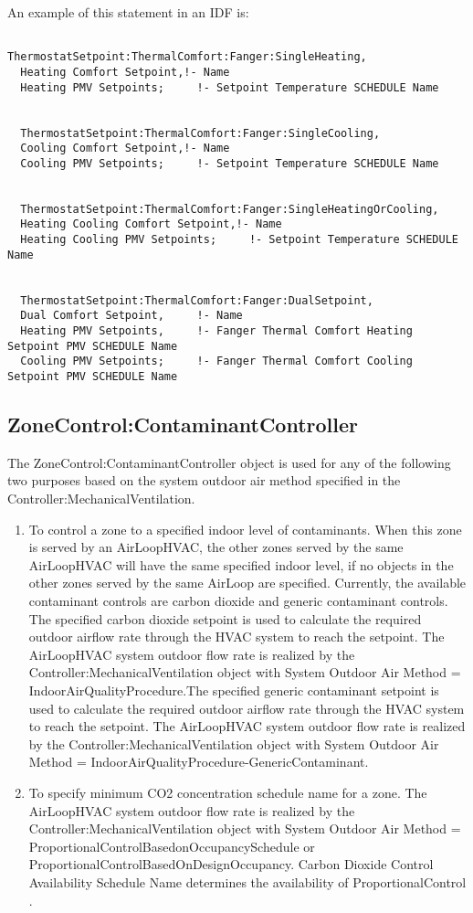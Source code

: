 An example of this statement in an IDF is:

\begin{lstlisting}

ThermostatSetpoint:ThermalComfort:Fanger:SingleHeating,
  Heating Comfort Setpoint,!- Name
  Heating PMV Setpoints;     !- Setpoint Temperature SCHEDULE Name


  ThermostatSetpoint:ThermalComfort:Fanger:SingleCooling,
  Cooling Comfort Setpoint,!- Name
  Cooling PMV Setpoints;     !- Setpoint Temperature SCHEDULE Name


  ThermostatSetpoint:ThermalComfort:Fanger:SingleHeatingOrCooling,
  Heating Cooling Comfort Setpoint,!- Name
  Heating Cooling PMV Setpoints;     !- Setpoint Temperature SCHEDULE Name


  ThermostatSetpoint:ThermalComfort:Fanger:DualSetpoint,
  Dual Comfort Setpoint,     !- Name
  Heating PMV Setpoints,     !- Fanger Thermal Comfort Heating Setpoint PMV SCHEDULE Name
  Cooling PMV Setpoints;     !- Fanger Thermal Comfort Cooling Setpoint PMV SCHEDULE Name
\end{lstlisting}

\subsection{ZoneControl:ContaminantController}\label{zonecontrolcontaminantcontroller}

The ZoneControl:ContaminantController object is used for any of the following two purposes based on the system outdoor air method specified in the Controller:MechanicalVentilation.

\begin{enumerate}
\def\labelenumi{\arabic{enumi})}
\item
  To control a zone to a specified indoor level of contaminants. When this zone is served by an AirLoopHVAC, the other zones served by the same AirLoopHVAC will have the same specified indoor level, if no objects in the other zones served by the same AirLoop are specified. Currently, the available contaminant controls are carbon dioxide and generic contaminant controls. The specified carbon dioxide setpoint is used to calculate the required outdoor airflow rate through the HVAC system to reach the setpoint. The AirLoopHVAC system outdoor flow rate is realized by the Controller:MechanicalVentilation object with System Outdoor Air Method = IndoorAirQualityProcedure.The specified generic contaminant setpoint is used to calculate the required outdoor airflow rate through the HVAC system to reach the setpoint. The AirLoopHVAC system outdoor flow rate is realized by the Controller:MechanicalVentilation object with System Outdoor Air Method = IndoorAirQualityProcedure-GenericContaminant.
\item
  To specify minimum CO2 concentration schedule name for a zone. The AirLoopHVAC system outdoor flow rate is realized by the Controller:MechanicalVentilation object with System Outdoor Air Method = ProportionalControlBasedonOccupancySchedule or ProportionalControlBasedOnDesignOccupancy. Carbon Dioxide Control Availability Schedule Name determines the availability of ProportionalControl .
\end{enumerate}

